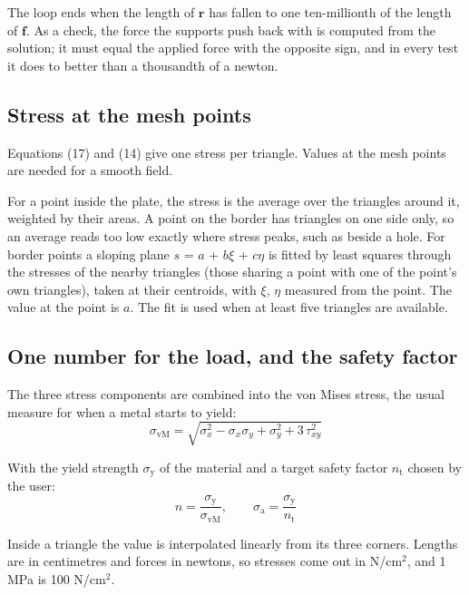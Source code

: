 \documentclass[11pt,a4paper]{article}
\begin{document}
The loop ends when the length of $\mathbf{r}$ has fallen to one ten-millionth of the length of $\mathbf{f}$. As a check, the force the supports push back with is computed from the solution; it must equal the applied force with the opposite sign, and in every test it does to better than a thousandth of a newton. 

\subsection{Stress at the mesh points}
 

Equations (17) and (14) give one stress per triangle. Values at the mesh points are needed for a smooth field. 

For a point inside the plate, the stress is the average over the triangles around it, weighted by their areas. A point on the border has triangles on one side only, so an average reads too low exactly where stress peaks, such as beside a hole. For border points a sloping plane $s$ = $a$ + $b \xi $ + $c \eta $ is fitted by least squares through the stresses of the nearby triangles (those sharing a point with one of the point's own triangles), taken at their centroids, with $\xi $, $\eta $ measured from the point. The value at the point is $a$. The fit is used when at least five triangles are available. 

\subsection{One number for the load, and the safety factor}
 

The three stress components are combined into the von Mises stress, the usual measure for when a metal starts to yield: 
\begin{equation}
\sigma_{\mathrm{vM}} = \sqrt{\sigma_x^2 - \sigma_x\sigma_y + \sigma_y^2 + 3\,\tau_{xy}^2}
\end{equation}
 

With the yield strength $\sigma _{\mathrm{y}}$ of the material and a target safety factor $n_{\mathrm{t}}$ chosen by the user: 
\begin{equation}
n = \frac{\sigma_{\mathrm{y}}}{\sigma_{\mathrm{vM}}}, \qquad \sigma_{\mathrm{a}} = \frac{\sigma_{\mathrm{y}}}{n_{\mathrm{t}}}
\end{equation}
 

Inside a triangle the value is interpolated linearly from its three corners. Lengths are in centimetres and forces in newtons, so stresses come out in N/cm$^2$, and 1 MPa is 100 N/cm$^2$. 
\end{document}
